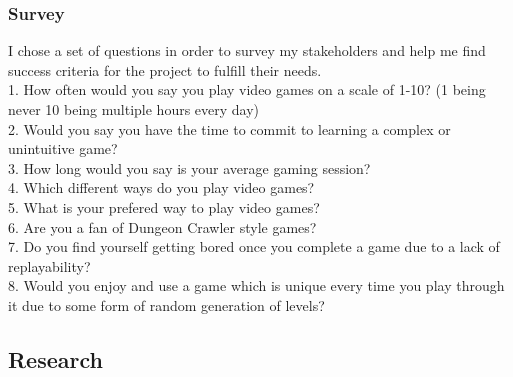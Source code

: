 \documentclass{article}
\begin{document}
        \subsubsection{Survey}
        I chose a set of questions in order to survey my stakeholders and help me find success criteria for the project to fulfill their needs.\\
        1. How often would you say you play video games on a scale of 1-10? (1 being never 10 being multiple hours every day)\\
        2. Would you say you have the time to commit to learning a complex or unintuitive game?\\
        3. How long would you say is your average gaming session?\\
        4. Which different ways do you play video games?\\
        5. What is your prefered way to play video games?\\
        6. Are you a fan of Dungeon Crawler style games?\\
        7. Do you find yourself getting bored once you complete a game due to a lack of replayability?\\
        8. Would you enjoy and use a game which is unique every time you play through it due to some form of random generation of levels?\\
        \newpage
        \subsection{Research}
\end{document}
